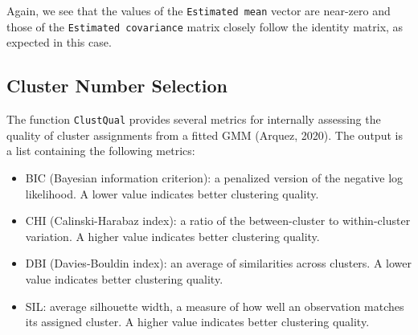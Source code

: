 \documentclass[12pt]{article}
\begin{document}
Again, we see that the values of the \texttt{Estimated\ mean} vector are
near-zero and those of the \texttt{Estimated\ covariance} matrix closely
follow the identity matrix, as expected in this case.

\hypertarget{cluster-number-selection}{%
\subsection{Cluster Number Selection}\label{cluster-number-selection}}

The function \texttt{ClustQual} provides several metrics for internally
assessing the quality of cluster assignments from a fitted GMM (Arquez,
2020). The output is a list containing the following metrics:

\begin{itemize}
\item
  BIC (Bayesian information criterion): a penalized version of the
  negative log likelihood. A lower value indicates better clustering
  quality.
\item
  CHI (Calinski-Harabaz index): a ratio of the between-cluster to
  within-cluster variation. A higher value indicates better clustering
  quality.
\item
  DBI (Davies-Bouldin index): an average of similarities across
  clusters. A lower value indicates better clustering quality.
\item
  SIL: average silhouette width, a measure of how well an observation
  matches its assigned cluster. A higher value indicates better
  clustering quality.
\end{itemize}
\end{document}
